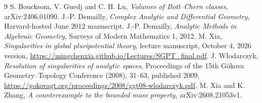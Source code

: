 \documentclass[11pt]{article}
\theoremstyle{remark}\newtheorem{remark}[theorem]{Remark}
\begin{document}
\begin{thebibliography}{9}
 S. Boucksom, V. Guedj and C. H. Lu,
\emph{Volumes of Bott--Chern classes}, arXiv:2406.01090.
 J.-P. Demailly, \emph{Complex Analytic and Differential
Geometry}, Harvard-hosted June 2012 manuscript.
 J.-P. Demailly, \emph{Analytic Methods in Algebraic
Geometry}, Surveys of Modern Mathematics 1, 2012.
 M. Xia, \emph{Singularities in global pluripotential
theory}, lecture manuscript, October 4, 2026 version,
\url{https://mingchenxia.github.io/Lectures/SGPT_final.pdf}.
 J. W\l{}odarczyk,
\emph{Resolution of singularities of analytic spaces},
Proceedings of the 15th G\"okova Geometry--Topology Conference
(2008), 31--63, published 2009,
\url{https://gokovagt.org/proceedings/2008/ggt08-wlodarczyk.pdf}.
 M. Xia and K. Zhang,
\emph{A counterexample to the bounded mass property},
arXiv:2608.21053v1.
\end{thebibliography}
\end{document}

